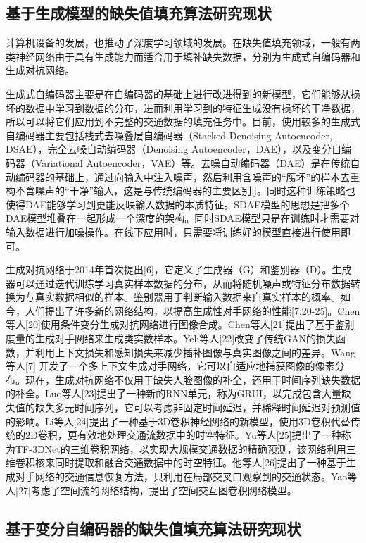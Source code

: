 \subsection{基于生成模型的缺失值填充算法研究现状}
计算机设备的发展，也推动了深度学习领域的发展。在缺失值填充领域，一般有两类神经网络由于具有生成能力而适合用于填补缺失数据，分别为生成式自编码器和生成对抗网络。

生成式自编码器主要是在自编码器的基础上进行改进得到的新模型，它们能够从损坏的数据中学习到数据的分布，进而利用学习到的特征生成没有损坏的干净数据，所以可以将它们应用到不完整的交通数据的填充任务中。目前，使用较多的生成式自编码器主要包括栈式去噪叠层自编码器（Stacked Denoising Autoencoder, DSAE），完全去噪自动编码器（Denoising Autoencoder，DAE），以及变分自编码器（Variational Autoencoder，VAE）等。去噪自动编码器（DAE）是在传统自动编码器的基础上，通过向输入中注入噪声，然后利用含噪声的“腐坏”的样本去重构不含噪声的“干净”输入，这是与传统编码器的主要区别[]。同时这种训练策略也使得DAE能够学习到更能反映输入数据的本质特征。SDAE模型的思想是把多个DAE模型堆叠在一起形成一个深度的架构。同时SDAE模型只是在训练时才需要对输入数据进行加噪操作。在线下应用时，只需要将训练好的模型直接进行使用即可。

生成对抗网络于2014年首次提出[6]，它定义了生成器（G）和鉴别器（D）。生成器可以通过迭代训练学习真实样本数据的分布，从而将随机噪声或特征分布数据转换为与真实数据相似的样本。鉴别器用于判断输入数据来自真实样本的概率。如今，人们提出了许多新的网络结构，以提高生成性对手网络的性能[7,20-25]。Chen等人[20]使用条件变分生成对抗网络进行图像合成。Chen等人[21]提出了基于鉴别度量的生成对手网络来生成类实数样本。Yeh等人[22]改变了传统GAN的损失函数，并利用上下文损失和感知损失来减少插补图像与真实图像之间的差异。Wang等人[7] 开发了一个多上下文生成对手网络，它可以自适应地捕获图像的像素分布。现在，生成对抗网络不仅用于缺失人脸图像的补全，还用于时间序列缺失数据的补全。Luo等人[23]提出了一种新的RNN单元，称为GRUI，以完成包含大量缺失值的缺失多元时间序列，它可以考虑非固定时间延迟，并稀释时间延迟对预测值的影响。Li等人[24]提出了一种基于3D卷积神经网络的新模型，使用3D卷积代替传统的2D卷积，更有效地处理交通流数据中的时空特征。Yu等人[25]提出了一种称为TF-3DNet的三维卷积网络，以实现大规模交通数据的精确预测，该网络利用三维卷积核来同时提取和融合交通数据中的时空特征。他等人[26]提出了一种基于生成对手网络的交通信息恢复方法，只利用在局部交叉口观察到的交通状态。Yao等人[27]考虑了空间流的网络结构，提出了空间交互图卷积网络模型。

\subsection{基于变分自编码器的缺失值填充算法研究现状}

